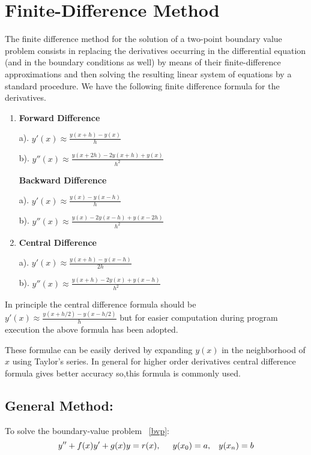\documentclass[aima203_lecturenotes_ku.tex]{subfiles}
\begin{document}
\section{Finite-Difference Method}
The finite difference method for the solution of a two-point boundary value problem consists in replacing the derivatives occurring in the differential equation (and in the boundary conditions as well) by means of their finite-difference approximations and then solving the resulting linear system of equations by a standard procedure. We have the following finite difference formula for the derivatives.
\begin{enumerate}
\item \textbf{Forward Difference}
  \begin{multicols}{2}
    a). $\displaystyle y'(x) \approx \frac{y(x+h) - y(x)}{h}$

    \columnbreak
    b). $\displaystyle y''(x) \approx \frac{y(x+2h) - 2y(x+h) +y(x)}{h^2}$
  \end{multicols}

  \textbf{Backward Difference}
  \begin{multicols}{2}
    a). $\displaystyle y'(x) \approx \frac{y(x) - y(x-h)}{h}$

    \columnbreak
    b). $\displaystyle y''(x) \approx \frac{y(x) -2y(x-h) + y(x-2h)}{h^2}$
  \end{multicols}

\item \textbf{Central Difference}
  \begin{multicols}{2}
    a). $\displaystyle y'(x) \approx \frac{y(x+h) - y(x-h)}{2h}$

    \columnbreak
    b). $\displaystyle y''(x) \approx \frac{y(x+h) - 2y(x)+ y(x-h)}{h^2}$
  \end{multicols}
\end{enumerate}
\begin{mdframed}
  In principle the central difference formula should be $\displaystyle y'(x) \approx \frac{y(x+h/2) - y(x-h/2)}{h}$ but for easier computation during program execution the above formula has been adopted.
\end{mdframed}
These formulae can be easily derived by expanding $y(x)$ in the neighborhood of $x$ using Taylor's series. In general for higher order derivatives central difference formula gives better accuracy so,this formula is commonly used.

\subsection{General Method:}
To solve the boundary-value problem ~\ref{bvp}:
\begin{equation}
  \label{bvp}
  y'' + f(x)y' + g(x)y = r(x), \hspace{5mm} y(x_0) = a, \hspace{3mm} y(x_{n}) = b
\end{equation}
\end{document}
